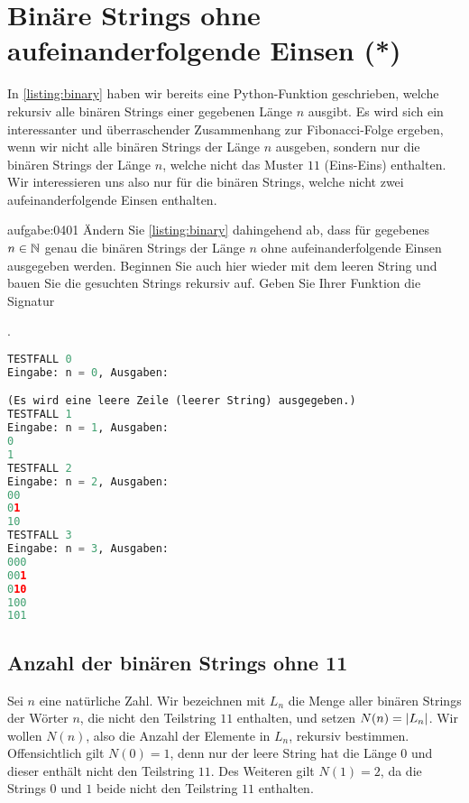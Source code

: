 \chapter{Binäre Strings ohne aufeinanderfolgende Einsen (*)}\label{ch:Kapitel04}
In \cref{listing:binary} haben wir bereits eine Python-Funktion geschrieben, welche rekursiv alle binären Strings einer gegebenen Länge $n$ ausgibt. Es wird sich ein interessanter und überraschender Zusammenhang zur Fibonacci-Folge ergeben, wenn wir nicht alle binären Strings der Länge $n$ ausgeben, sondern nur die binären Strings der Länge $n$, welche nicht das Muster $11$ (Eins-Eins) enthalten. Wir interessieren uns also nur für die binären Strings, welche nicht zwei aufeinanderfolgende Einsen enthalten.
\begin{aufgabe}{aufgabe:0401}
Ändern Sie \cref{listing:binary} dahingehend ab, dass für gegebenes $n\in\mathbb{N}$ genau die binären Strings der Länge $n$ ohne aufeinanderfolgende Einsen ausgegeben werden. Beginnen Sie auch hier wieder mit dem leeren String und bauen Sie die gesuchten Strings rekursiv auf. Geben Sie Ihrer Funktion die Signatur

.
\begin{lstlisting}[language=Python,caption=binäre Strings ohne 11 rekursiv ausgeben,numbers=none]
TESTFALL 0
Eingabe: n = 0, Ausgaben:

(Es wird eine leere Zeile (leerer String) ausgegeben.)
TESTFALL 1
Eingabe: n = 1, Ausgaben:
0
1
TESTFALL 2
Eingabe: n = 2, Ausgaben:
00
01
10
TESTFALL 3
Eingabe: n = 3, Ausgaben:
000
001
010
100
101
\end{lstlisting}
\end{aufgabe}

\clearpage


\section{Anzahl der binären Strings ohne 11}
Sei $n$ eine natürliche Zahl. Wir bezeichnen mit $L_n$ die Menge aller binären Strings der Wörter $n$, die nicht den Teilstring $11$ enthalten, und setzen $N(n) = \left\lvert L_n\right\rvert$. Wir wollen $N(n)$, also die Anzahl der Elemente in $L_n$, rekursiv bestimmen. Offensichtlich gilt $N(0) = 1$, denn nur der leere String hat die Länge $0$ und dieser enthält nicht den Teilstring $11$. Des Weiteren gilt $N(1) = 2$, da die Strings $0$ und $1$ beide nicht den Teilstring $11$ enthalten.

